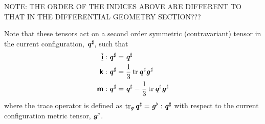 NOTE: THE ORDER OF THE INDICES ABOVE ARE DIFFERENT TO THAT IN THE DIFFERENTIAL GEOMETRY SECTION???

Note that these tensors act on a second order symmetric (contravariant) tensor
in the current configuration, $ \boldsymbol{\mathit{q}}^{\sharp} $, such that
\begin{align}
  \doubledotprod{\spatialsymidentitytensorfour}{\sharptensor{\tensortwo{q}}}&=\sharptensor{\tensortwo{q}}
  \\ \doubledotprod{\spatialsphericaltensorfour}{\sharptensor{\tensortwo{q}}}&=\dfrac{1}{3}\trace{}{\sharptensor{\tensortwo{q}}}\sharptensor{\tensortwo{g}}
  \\ \doubledotprod{\spatialdeviatorictensorfour}{\sharptensor{\tensortwo{q}}}&=\sharptensor{\tensortwo{q}}-\dfrac{1}{3}\trace{}{\sharptensor{\tensortwo{q}}}\sharptensor{\tensortwo{g}}
\end{align}
where the trace operator is defined as $\trace{\tensortwo{g}}{\sharptensor{\tensortwo{q}}}=\doubledotprod{\flattensor{\tensortwo{g}}}{\sharptensor{\tensortwo{q}}}$ \ie
with respect to the current configuration metric tensor, $\boldsymbol{\mathit{g}}^{\flat}$.

